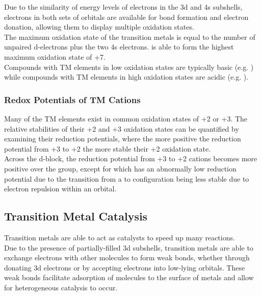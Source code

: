 \documentclass[../main]{subfiles}
\begin{document}
	Due to the similarity of energy levels of electrons in the 3d and 4s subshells, electrons in both sets of orbitals are available for bond formation and electron donation, allowing them to display multiple oxidation states. \\

	The maximum oxidation state of the transition metals is equal to the number of unpaired d-electrons plus the two 4s electrons.  is able to form the highest maximum oxidation state of +7. \\

	Compounds with TM elements in low oxidation states are typically basic (e.g. ) while compounds with TM elements in high oxidation states are acidic (e.g. ). \\

	\subsubsection{Redox Potentials of TM Cations}

	Many of the TM elements exist in common oxidation states of +2 or +3. The relative stabilities of their +2 and +3 oxidation states can be quantified by examining their reduction potentials, where the more positive the reduction potential from +3 to +2 the more stable their +2 oxidation state. \\

	Across the d-block, the reduction potential from +3 to +2 cations becomes more positive over the group, except for  which has an abnormally low reduction potential due to the transition from a  to  configuration being less stable due to electron repulsion within an orbital.

	\subsection{Transition Metal Catalysis}

	Transition metals are able to act as catalysts to speed up many reactions. \\

	Due to the presence of partially-filled 3d subshells, transition metals are able to exchange electrons with other molecules to form weak bonds, whether through donating 3d electrons or by accepting electrons into low-lying orbitals. These weak bonds facilitate adsorption of molecules to the surface of metals and allow for heterogeneous catalysis to occur. \\
\end{document}
